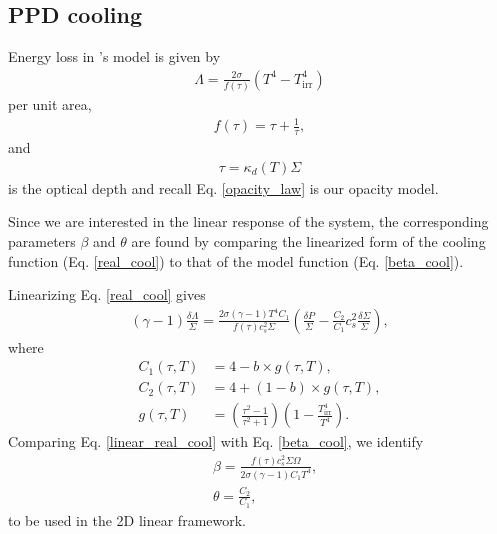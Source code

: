 \subsection{PPD cooling}
Energy loss in \citeauthor{rafikov15}'s model is given
by 
\begin{align}\label{real_cool}
  \Lambda = \frac{2\sigma}{f(\tau)}\left(T^4 - T_\mathrm{irr}^4\right)
\end{align}
per unit area, 
\begin{align}
  f(\tau) = \tau + \frac{1}{\tau},
\end{align}
and
\begin{align}
  \tau = \kappa_d(T)\Sigma
\end{align}
is the optical depth and recall Eq. \ref{opacity_law} 
is our opacity model. 

Since we are interested in the linear response of the system, the
corresponding parameters $\beta$ and $\theta$ are found by
comparing the linearized form of the cooling function
(Eq. \ref{real_cool}) to that of the model function
(Eq. \ref{beta_cool}).  


Linearizing Eq. \ref{real_cool} gives   
\begin{align}\label{linear_real_cool}
  (\gamma-1)\frac{\delta\Lambda}{\Sigma} = \frac{2\sigma(\gamma-1)
    T^4C_1}{f(\tau)c_{s}^2\Sigma}\left(\frac{\delta P}{\Sigma} -
  \frac{C_2}{C_1}c_{s}^2\frac{\delta\Sigma}{\Sigma}\right), 
\end{align}
where
\begin{align}
C_1(\tau, T) &= 4 - b\times g(\tau, T),\\ 
C_2(\tau, T) &= 4 + (1-b)\times g(\tau, T),\\ 
  g(\tau, T) &= \left( \frac{\tau^2-1}{\tau^2+1}\right)\left(1 -
  \frac{T_\mathrm{irr}^4}{T^4}\right). 
\end{align}
Comparing Eq. \ref{linear_real_cool} with Eq. \ref{beta_cool}, we identify
\begin{align}
  &\beta = \frac{f(\tau)c_s^2\Sigma\Omega}{2\sigma(\gamma-1)C_1T^4},\\
  &\theta = \frac{C_2}{C_1}, 
\end{align}
to be used in the 2D linear framework. 

